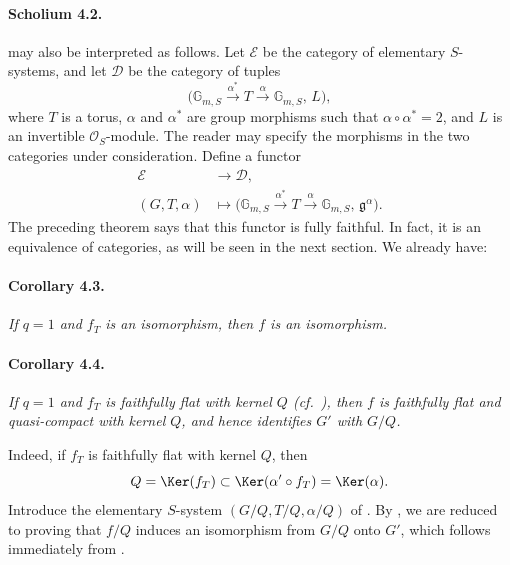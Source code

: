 \paragraph{\textbf{Scholium 4.2.}}
 may also be interpreted as follows.  Let
\(\mathcal E\) be the category of elementary \(S\)-systems, and let
\(\mathcal D\) be the category of tuples
\[
  \bigl(
    \mathbb G_{m,S}\xrightarrow{\alpha^\ast}T
    \xrightarrow{\alpha}\mathbb G_{m,S},\,L
  \bigr),
\]
where \(T\) is a torus, \(\alpha\) and \(\alpha^\ast\) are group
morphisms such that \(\alpha\circ\alpha^\ast=2\), and \(L\) is an
invertible \(\mathcal O_S\)-module.  The reader may specify the
morphisms in the two categories under consideration.  Define a
functor
\[
\begin{aligned}
  \mathcal E&\longrightarrow\mathcal D,\\
  (G,T,\alpha)&\longmapsto
  \bigl(
    \mathbb G_{m,S}\xrightarrow{\alpha^\ast}T
    \xrightarrow{\alpha}\mathbb G_{m,S},\,
    \mathfrak g^\alpha
  \bigr).
\end{aligned}
\]
The preceding theorem says that this functor is fully faithful.  In
fact, it is an equivalence of categories, as will be seen in the next
section.  We already have:

\paragraph{\textbf{Corollary 4.3.}}
\emph{If \(q=1\) and \(f_T\) is an isomorphism, then \(f\) is an
isomorphism.}

\paragraph{\textbf{Corollary 4.4.}}
\emph{If \(q=1\) and \(f_T\) is faithfully flat with kernel \(Q\)
\textup{(cf.\ )}, then \(f\) is faithfully flat and
quasi-compact with kernel \(Q\), and hence identifies \(G'\) with
\(G/Q\).}

Indeed, if \(f_T\) is faithfully flat with kernel \(Q\), then
\[
  Q=\Ker(f_T)
  \subset\Ker(\alpha'\circ f_T)
  =\Ker(\alpha).
\]
Introduce the elementary \(S\)-system
\((G/Q,T/Q,\alpha/Q)\) of .  By , we are reduced to proving
that \(f/Q\) induces an isomorphism from \(G/Q\) onto \(G'\), which
follows immediately from .

